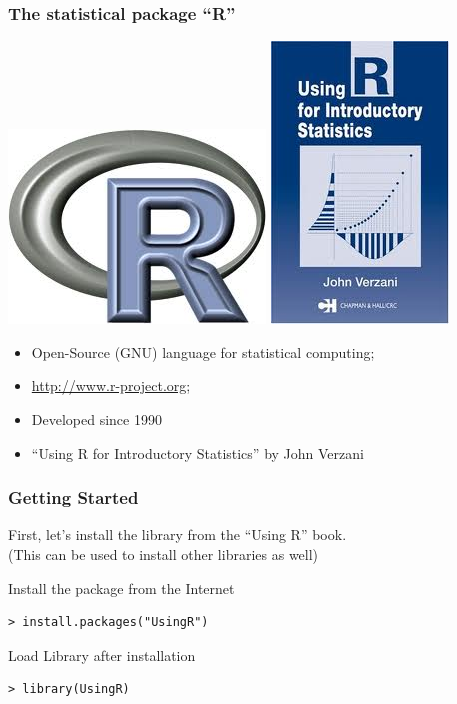 \documentclass[10pt]{beamer}
\begin{document}
\begin{frame}
  \frametitle{The statistical package ``R''}
  \begin{center}
    \includegraphics[height=0.2\textheight]{img/rlogo}
    \hfill
    \includegraphics[height=0.3\textheight]{img/rintrobook}
  \end{center}
  \bigskip
  
  \begin{itemize}
  \item Open-Source (GNU) language for statistical computing;
  \item \url{http://www.r-project.org};
  \item Developed since 1990
  \item ``Using R for Introductory Statistics'' by John Verzani
  \end{itemize}
\end{frame}

\begin{frame}
  \frametitle{Getting Started} 
  
  First, let's install the library from the ``Using R'' book.\\(This can be
  used to install other libraries as well)

  \begin{block}{Install the package from the Internet}
\begin{verbatim}
> install.packages("UsingR")
\end{verbatim}
  \end{block}

  \begin{block}{Load Library after installation}
\begin{verbatim}
> library(UsingR)
\end{verbatim}
  \end{block}
\end{frame}
\end{document}
